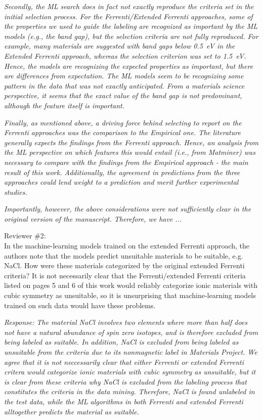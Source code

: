 \documentclass[11pt, a4paper]{letter} %
\begin{document}
\textit{Secondly, the ML search does in fact not exactly reproduce the criteria set in the initial selection process. For the Ferrenti/Extended Ferrenti approaches, some of the properties we used to guide the labeling are recognized as important by the ML models (e.g., the band gap), but the selection criteria are not fully reproduced. For example, many materials are suggested with band gaps below 0.5~eV in the Extended Ferrenti approach, whereas the selection criterion was set to 1.5~eV. Hence, the models are recognizing the expected properties as important, but there are differences from expectation. The ML models seem to be recognizing some pattern in the data that was not exactly anticipated. From a materials science perspective, it seems that the exact value of the band gap is not predominant, although the feature itself is important. }

\textit{Finally, as mentioned above, a driving force behind selecting to report on the Ferrenti approaches was the comparison to the Empirical one. The literature generally expects the findings from the Ferrenti approach. Hence, an analysis from the ML perspective on which features this would entail (i.e., from Matminer) was necessary to compare with the findings from the Empirical approach - the main result of this work. Additionally, the agreement in predictions from the three approaches could lend weight to a prediction and merit further experimental studies.  }

\textit{Importantly, however, the above considerations were not sufficiently clear in the original version of the manuscript. Therefore, we have ... }


Reviewer \#2: \\
In the machine-learning models trained on the extended Ferrenti approach, the authors note that the models predict unsuitable materials to be suitable, e.g. NaCl. How were these materials categorized by the original extended Ferrenti criteria? It is not necessarily clear that the Ferrenti/extended Ferrenti criteria listed on pages 5 and 6 of this work would reliably categorize ionic materials with cubic symmetry as unsuitable, so it is unsurprising that machine-learning models trained on such data would have these problems.

\textit{Response:} 
\textit{The material NaCl involves two elements where more than half does not have a natural abundance of spin zero isotopes, and is therefore excluded from being labeled as suitable. In addition, NaCl is excluded from being labeled as unsuitable from the criteria due to its nonmagnetic label in Materials Project. We agree that it is not neccessarily clear that either Ferrenti or extended Ferrenti critera would categorize ionic materials with cubic symmetry as unsuitable, but it is clear from these criteria why NaCl is excluded from the labeling process that constitutes the criteria in the data mining. Therefore, NaCl is found unlabeled in the test data, while the ML algorithms in both Ferrenti and extended Ferrenti alltogether predicts the material as suitable.}  
\end{document}
